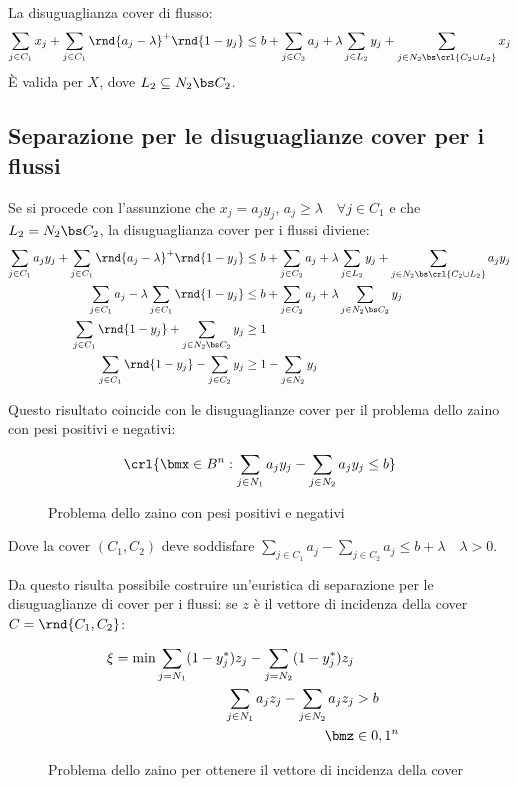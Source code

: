 \documentclass[\main/main.tex]{subfiles}
\begin{document}
\begin{proposition}
    La disuguaglianza cover di flusso:
    \[
        \sum_{j \in C_1} x_j + \sum_{j \in C_1} \rnd{a_j - \lambda}^+\rnd{1-y_j} \leq b + \sum_{j \in C_2} a_j + \lambda \sum_{j \in L_2}y_j + \sum_{j \in N_2 \bs \crl{C_2 \cup L_2}}x_j
    \]    È valida per \(X\), dove \(L_2 \subseteq N_2 \bs C_2\).
\end{proposition}

\subsection{Separazione per le disuguaglianze cover per i flussi}
Se si procede con l'assunzione che \(x_j = a_j y_j\), \(a_j \geq \lambda \quad \forall j \in C_1\) e che \(L_2 = N_2 \bs C_2\), la disuguaglianza cover per i flussi diviene:
\begin{align*}
    \sum_{j \in C_1} a_j y_j + \sum_{j \in C_1} \rnd{a_j - \lambda}^+\rnd{1-y_j} &\leq b + \sum_{j \in C_2} a_j + \lambda \sum_{j \in L_2}y_j + \sum_{j \in N_2 \bs \crl{C_2 \cup L_2}}a_j y_j\\
    \sum_{j \in C_1} a_j - \lambda\sum_{j \in C_1} \rnd{1-y_j} &\leq b + \sum_{j \in C_2} a_j + \lambda\sum_{j \in N_2 \bs C_2} y_j\\
    \sum_{j \in C_1} \rnd{1-y_j} + \sum_{j \in N_2 \bs C_2} y_j &\geq 1\\
    \sum_{j \in C_1} \rnd{1-y_j} - \sum_{j \in C_2} y_j &\geq 1 - \sum_{j \in N_2} y_j\\
\end{align*}

Questo risultato coincide con le disuguaglianze cover per il problema dello zaino con pesi positivi e negativi:

\begin{figure}
    \[
        \crl{\bmx \in B^n: \sum_{j \in N_1} a_j y_j - \sum_{j \in N_2} a_j y_j \leq b}
    \]    \caption{Problema dello zaino con pesi positivi e negativi}
\end{figure}

Dove la cover \((C_1, C_2)\) deve soddisfare \(\sum_{j \in C_1} a_j - \sum_{j \in C_2} a_j \leq b + \lambda \quad \lambda > 0\).

Da questo risulta possibile costruire un'euristica di separazione per le disuguaglianze di cover per i flussi: se \(z\) è il vettore di incidenza della cover \(C =\rnd{C_1, C_2}\):

\begin{figure}
    \begin{align*}
        \xi = \min \sum_{j=N_1} (1- y^*_j)z_j - \sum_{j=N_2} (1- y^*_j)z_j\\
        \sum_{j \in N_1} a_j z_j - \sum_{j \in N_2} a_j z_j &> b\\
        \bmz &\in {0,1}^n
    \end{align*}
    \caption{Problema dello zaino per ottenere il vettore di incidenza della cover}\label{zaino_cover}
\end{figure}
\end{document}
